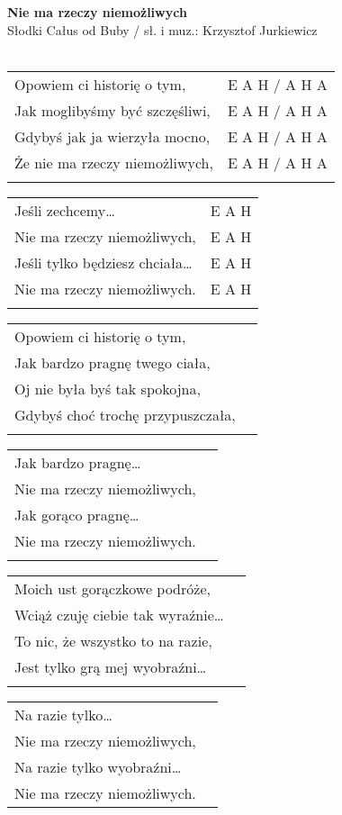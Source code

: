 \documentclass[a5paper]{article}
\begin{document}


\noindent
\fontsize{12pt}{15pt}\selectfont
\textbf{Nie ma rzeczy niemożliwych} \\
\fontsize{8pt}{10pt}\selectfont
Słodki Całus od Buby / sł. i muz.: Krzysztof Jurkiewicz \\ \\
\fontsize{10pt}{12pt}\selectfont
{}
\begin{tabular}{@{}p{7.50cm}p{3cm}@{}}
\noindent
Opowiem ci historię o tym, & E A H / A H A \\
Jak moglibyśmy być szczęśliwi, & E A H / A H A \\
Gdybyś jak ja wierzyła mocno, & E A H / A H A \\
Że nie ma rzeczy niemożliwych, & E A H / A H A \\ \\
\end{tabular}

\noindent
\begin{tabular}{@{}p{6.50cm}p{3cm}@{}}
Jeśli zechcemy… & E A H \\
Nie ma rzeczy niemożliwych, & E A H \\
Jeśli tylko będziesz chciała… & E A H \\
Nie ma rzeczy niemożliwych. & E A H \\ \\
\end{tabular}

\noindent
\begin{tabular}{@{}p{7.50cm}p{3cm}@{}}
Opowiem ci historię o tym, \\
Jak bardzo pragnę twego ciała,\\
Oj nie była byś tak spokojna, \\
Gdybyś choć trochę przypuszczała, \\ \\
\end{tabular}

\noindent
\begin{tabular}{@{}p{7.50cm}p{3cm}@{}}
Jak bardzo pragnę… \\
Nie ma rzeczy niemożliwych, \\
Jak gorąco pragnę… \\
Nie ma rzeczy niemożliwych. \\ \\
\end{tabular}

\noindent
\begin{tabular}{@{}p{7.50cm}p{3cm}@{}}
Moich ust gorączkowe podróże, \\
Wciąż czuję ciebie tak wyraźnie… \\
To nic, że wszystko to na razie, \\
Jest tylko grą mej wyobraźni… \\ \\
\end{tabular}

\noindent
\begin{tabular}{@{}p{7.50cm}p{3cm}@{}}
Na razie tylko… \\ 
Nie ma rzeczy niemożliwych, \\
Na razie tylko wyobraźni… \\
Nie ma rzeczy niemożliwych. 
\end{tabular}
\end{document}
